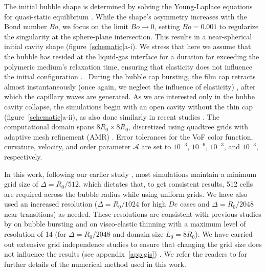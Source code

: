\documentclass{jfm}
\newcommand{\oo}{\color{black} \normalfont}
\newcommand{\bb}{\color{black} \normalfont}
\begin{document}
The initial bubble shape is determined by solving the Young-Laplace equations for quasi-static equilibrium \citep{princen1963shape,toba1959drop,villermaux2022bubbles,VatsalThesis}.
While the shape's asymmetry increases with the Bond number $Bo$, we focus on the limit $Bo \to 0$, setting $Bo = 0.001$ to regularize the singularity at the sphere-plane intersection. This results in a near-spherical initial cavity shape (figure~\ref{schematic}a-i).
\oo We stress that here we assume that the bubble has resided at the liquid-gas interface for a duration far exceeding the polymeric medium's relaxation time, ensuring that elasticity does not influence the initial configuration \citep{ari2024bursting}.\bb\,
During the bubble cap bursting, the film cap retracts almost instantaneously \oo(once again, we neglect the influence of elasticity)\bb, after which the capillary waves are generated.
As we are interested only in the bubbe cavity collapse, the simulations begin with an open cavity without the thin cap (figure~\ref{schematic}a-ii), as also done similarly in recent studies \citep{deike2018dynamics, gordillo2019capillary,sanjay2021bursting}. The computational domain spans $8R_0 \times 8R_0$, discretized using quadtree grids with adaptive mesh refinement (AMR) \citep{popinet2009accurate}. Error tolerances for the VoF color function, curvature, velocity, and order parameter $\boldsymbol{\mathcal{A}}$ are set to $10^{-3}$, $10^{-6}$, $10^{-3}$, and $10^{-3}$, respectively.

In this work, following our earlier study \citep{sanjay2021bursting}, most simulations maintain a minimum grid size of $\Delta = R_0/512$, which dictates that, to get consistent results, 512 cells are required across the bubble radius while using uniform grids.
We have also used an increased resolution ($\Delta = R_0/1024$ for high $De$ cases and $\Delta = R_0/2048$ near transitions) as needed. 
\oo
These resolutions are consistent with previous studies by \citet{berny2020role,berny2021statistics} on bubble bursting and \citet{turkoz2018axisymmetric,turkoz2021simulation} on visco-elastic thinning with a maximum level of resolution of 14 (for $\Delta = R_0/2048$ and domain size $L_0 = 8R_0$).
\bb 
We have carried out extensive grid independence studies to ensure that changing the grid size does not influence the results \oo (see appendix~\ref{app:gis})\bb. We refer the readers to \citet{popinet2015quadtree,VatsalThesis,Sanjay2024code} for further details of the numerical method used in this work.
\end{document}
